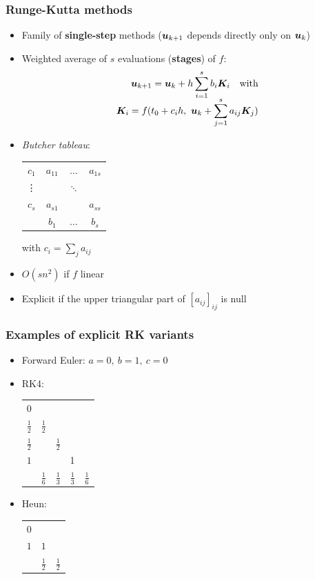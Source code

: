 \documentclass{beamer}
\begin{document}
\begin{frame} %
	\frametitle{Runge-Kutta methods}
	\begin{itemize}
		\item Family of \textbf{single-step} methods ($\boldsymbol u_{k+1}$ depends directly only on $\boldsymbol u_k$)
		\item Weighted average of $s$ evaluations (\textbf{stages}) of $f$: \\[-20pt]
		\begin{align*}
			\boldsymbol u_{k+1} = \boldsymbol u_{k} + h \sum_{i=1}^s b_i \boldsymbol K_i \quad \text{with} \\[-5pt]
			\boldsymbol K_i = f(t_0 + c_i h, \ \boldsymbol u_k + \sum_{j=1}^s a_{ij} \boldsymbol K_j)
		\end{align*}
		\pause
		\vspace{-22pt}
		\item \textit{Butcher tableau}:
		\begin{center}
			\begin{tabular}{c|ccc}
				$c_1$ & $a_{11}$ & $\dots$ & $a_{1s}$ \\
				\vdots & & $\ddots$ & \\
				$c_s$ & $a_{s1}$ & & $a_{ss}$ \\
				\hline
				& $b_1$ & $\dots$ & $b_s$
			\end{tabular}
		\hspace{30pt} with $c_i = \sum_j a_{ij}$
		\pause
		\end{center}
		\item $O(s n^2)$ if $f$ linear
		\item Explicit if the upper triangular part of $[a_{ij}]_{ij}$ is null
	\end{itemize}
\end{frame}


\begin{frame} %
	\frametitle{Examples of explicit RK variants}
	\begin{itemize}
		\item Forward Euler: $ a = 0, \ b = 1, \ c = 0 $ %
		\item RK4: \\ %
		\begin{center}
			\begin{tabular}{c|cccc}
				$0$ & & & & \\
				$\frac 1 2$ & $\frac 1 2$ & & & \\
				$\frac 1 2$ & & $\frac 1 2$ & & \\
				$1$ & & & 1 & \\
				\hline
				& $\frac 1 6$ & $\frac 1 3$ & $\frac 1 3$ & $\frac 1 6$
				\end{tabular}
		\end{center}
		\item Heun: %
		\begin{center}
			\begin{tabular}{c|cc}
				$0$ &     & \\
				$1$ & $1$ & \\
				\hline
				& $\frac 1 2$ & $\frac 1 2$
			\end{tabular}
		\end{center}	
	\end{itemize}
\end{frame}
\end{document}
